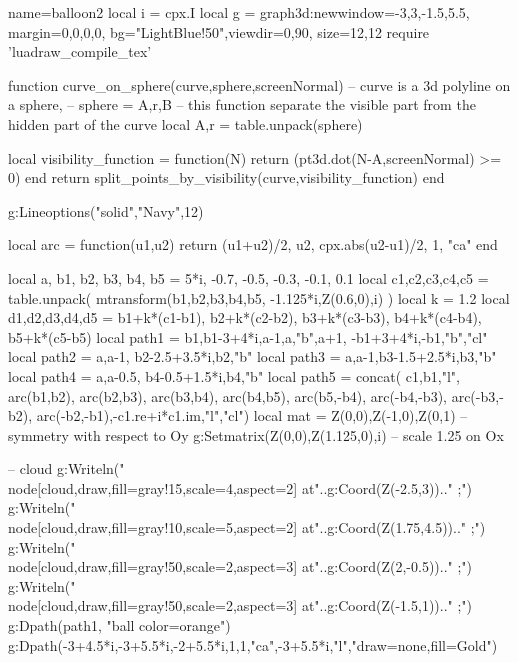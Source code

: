 \documentclass[border=5pt]{standalone}
\begin{document}
\begin{luadraw}{name=balloon2}
local i = cpx.I
local g = graph3d:new{window={-3,3,-1.5,5.5}, margin={0,0,0,0}, bg="LightBlue!50",viewdir={0,90}, size={12,12}}
require 'luadraw_compile_tex'

function curve_on_sphere(curve,sphere,screenNormal)
    -- curve is a 3d polyline on a sphere,
    -- sphere = {A,r,B}
    -- this function separate the visible part from the hidden part of the curve
    local A,r = table.unpack(sphere)
    
    local visibility_function = function(N)
        return (pt3d.dot(N-A,screenNormal) >= 0)
    end
    return split_points_by_visibility(curve,visibility_function)
end

g:Lineoptions("solid","Navy",12)

local arc = function(u1,u2)
    return {(u1+u2)/2, u2, cpx.abs(u2-u1)/2, 1, "ca"}
end

local a, b1, b2, b3, b4, b5 = 5*i, -0.7, -0.5, -0.3, -0.1, 0.1
local c1,c2,c3,c4,c5 = table.unpack( mtransform({b1,b2,b3,b4,b5}, {-1.125*i,Z(0.6,0),i}) )
local k = 1.2
local d1,d2,d3,d4,d5 = b1+k*(c1-b1), b2+k*(c2-b2), b3+k*(c3-b3), b4+k*(c4-b4), b5+k*(c5-b5)
local path1 = {b1,b1-3+4*i,a-1,a,"b",a+1, -b1+3+4*i,-b1,"b","cl"}
local path2 = {a,a-1, b2-2.5+3.5*i,b2,"b"}
local path3 = {a,a-1,b3-1.5+2.5*i,b3,"b"}
local path4 = {a,a-0.5, b4-0.5+1.5*i,b4,"b"}
local path5 = concat( {c1,b1,"l"}, arc(b1,b2), arc(b2,b3), arc(b3,b4), arc(b4,b5), arc(b5,-b4), arc(-b4,-b3), arc(-b3,-b2), arc(-b2,-b1),{-c1.re+i*c1.im,"l","cl"})
local mat = {Z(0,0),Z(-1,0),Z(0,1)} -- symmetry with respect to Oy
g:Setmatrix({Z(0,0),Z(1.125,0),i}) -- scale 1.25 on Ox

-- cloud
g:Writeln("\\node[cloud,draw,fill=gray!15,scale=4,aspect=2] at"..g:Coord(Z(-2.5,3)).." {};")
g:Writeln("\\node[cloud,draw,fill=gray!10,scale=5,aspect=2] at"..g:Coord(Z(1.75,4.5)).." {};")
g:Writeln("\\node[cloud,draw,fill=gray!50,scale=2,aspect=3] at"..g:Coord(Z(2,-0.5)).." {};")
g:Writeln("\\node[cloud,draw,fill=gray!50,scale=2,aspect=3] at"..g:Coord(Z(-1.5,1)).." {};")
g:Dpath(path1, "ball color=orange")
g:Dpath({-3+4.5*i,-3+5.5*i,-2+5.5*i,1,1,"ca",-3+5.5*i,"l"},"draw=none,fill=Gold")


\end{luadraw}
\end{document}
